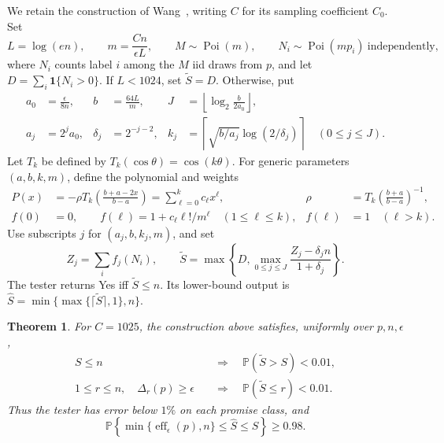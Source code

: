 \documentclass[10pt]{article}
\newtheorem{theorem}{Theorem}
\newcommand{\Prob}{\mathbb P}
\newcommand{\Poi}{\operatorname{Poi}}
\newcommand{\eff}{\operatorname{eff}}
\newcommand{\ind}{\mathbf 1}
\begin{document}
We retain the construction of Wang~\cite[Section~3]{wang}, writing $C$ for
its sampling coefficient $C_0$. Set
\begin{equation}
 L=\log(en),\qquad m=\frac{Cn}{\epsilon L},\qquad
 M\sim\Poi(m),\qquad N_i\sim\Poi(mp_i)\ \text{independently},
 \label{eq:budget}
\end{equation}
where $N_i$ counts label $i$ among the $M$ iid draws from $p$, and let
$D=\sum_i\ind\{N_i>0\}$. If $L<1024$, set $\widetilde S=D$.
Otherwise, put
\begin{align}
 a_0&=\frac{\epsilon}{8n},& b&=\frac{64L}{m},&
 J&=\left\lfloor\log_2\frac b{2a_0}\right\rfloor,\label{eq:scales1}\\
 a_j&=2^ja_0,& \delta_j&=2^{-j-2},&
 k_j&=\left\lceil\sqrt{b/a_j}\log(2/\delta_j)\right\rceil
 \quad(0\le j\le J).\label{eq:scales2}
\end{align}
Let $T_k$ be defined by $T_k(\cos\theta)=\cos(k\theta)$.
For generic parameters $(a,b,k,m)$, define the polynomial and weights
\begin{align}
 P(x)&=-\rho T_k\!\left(\frac{b+a-2x}{b-a}\right)
       =\sum_{\ell=0}^k c_\ell x^\ell,
 &\rho&=T_k\!\left(\frac{b+a}{b-a}\right)^{-1},\label{eq:polynomial}\\
 f(0)&=0,\qquad
 f(\ell)=1+c_\ell\ell!/m^\ell\quad(1\le\ell\le k),
 & f(\ell)&=1\quad(\ell>k).\label{eq:weights}
\end{align}
Use subscripts $j$ for $(a_j,b,k_j,m)$, and set
\begin{equation}
 Z_j=\sum_i f_j(N_i),\qquad
 \widetilde S=\max\left\{D,\max_{0\le j\le J}
                  \frac{Z_j-\delta_jn}{1+\delta_j}\right\}.
 \label{eq:statistic}
\end{equation}
The tester returns Yes iff $\widetilde S\le n$. Its lower-bound output is
$\widehat S=\min\{\max\{\lceil\widetilde S\rceil,1\},n\}$.

\begin{theorem}\label{thm:main}
For $C=1025$, the construction above satisfies, uniformly over $p,n,\epsilon$,
\begin{align}
 S\le n&\quad\Longrightarrow\quad
     \Prob(\widetilde S>S)<0.01,\label{eq:upper}\\
 1\le r\le n,\quad\Delta_r(p)\ge\epsilon
     &\quad\Longrightarrow\quad
     \Prob(\widetilde S\le r)<0.01.\label{eq:lower}
\end{align}
Thus the tester has error below $1\%$ on each promise class, and
\begin{equation}
 \Prob\!\left\{\min\{\eff_\epsilon(p),n\}\le\widehat S\le S\right\}
 \ge0.98.\label{eq:coverage}
\end{equation}
\end{theorem}
\end{document}
